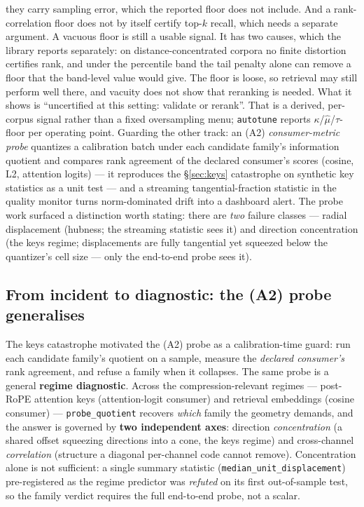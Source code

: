 \documentclass[11pt]{article}
\begin{document}
they carry sampling error, which the reported floor does not include. And a
rank-correlation floor does not by itself certify top-$k$ recall, which needs a
separate argument. A vacuous floor is still a usable signal. It has two causes,
which the library reports separately: on distance-concentrated corpora no finite
distortion certifies rank, and under the percentile band the tail penalty alone
can remove a floor that the band-level value would give. The floor is
loose, so retrieval may still perform well there, and vacuity does not show that
reranking is needed. What it shows is ``uncertified at this setting: validate
or rerank''. That is a derived, per-corpus signal rather than a fixed
oversampling menu; \texttt{autotune}
reports $\kappa$/$\hat\mu$/$\tau$-floor per operating point. Guarding the
other track: an (A2) \emph{consumer-metric probe} quantizes a calibration
batch under each candidate family's information quotient and compares rank
agreement of the declared consumer's scores (cosine, L2, attention logits)
--- it reproduces the \S\ref{sec:keys} catastrophe on synthetic key
statistics as a unit test --- and a streaming tangential-fraction statistic
in the quality monitor turns norm-dominated drift into a dashboard alert.
The probe work surfaced a distinction worth stating: there are \emph{two}
failure classes --- radial displacement (hubness; the streaming statistic
sees it) and direction concentration (the keys regime; displacements are
fully tangential yet squeezed below the quantizer's cell size --- only the
end-to-end probe sees it).

\subsection{From incident to diagnostic: the (A2) probe generalises}\label{sec:cert:a2}
The keys catastrophe motivated the (A2) probe as a calibration-time guard: run
each candidate family's quotient on a sample, measure the \emph{declared
consumer's} rank agreement, and refuse a family when it collapses. The same probe
is a general \textbf{regime diagnostic}. Across the compression-relevant regimes
--- post-RoPE attention keys (attention-logit consumer) and retrieval embeddings
(cosine consumer) --- \texttt{probe\_quotient} recovers \emph{which} family the
geometry demands, and the answer is governed by \textbf{two independent axes}:
direction \emph{concentration} (a shared offset squeezing directions into a cone,
the keys regime) and cross-channel \emph{correlation} (structure a diagonal
per-channel code cannot remove). Concentration alone is not sufficient: a single
summary statistic (\texttt{median\_unit\_displacement}) pre-registered as the
regime predictor was \emph{refuted} on its first out-of-sample test, so the family
verdict requires the full end-to-end probe, not a scalar.
\end{document}
